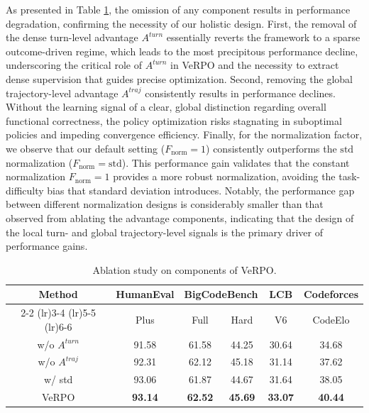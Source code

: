 \documentclass[11pt]{article}
\begin{document}
As presented in Table \ref{tab:Ablation-Study}, the omission of any component results in performance degradation, confirming the necessity of our holistic design. First, the removal of the dense turn-level advantage $A^{turn}$ essentially reverts the framework to a sparse outcome-driven regime, which leads to the most precipitous performance decline, underscoring the critical role of $A^{turn}$ in VeRPO and the necessity to extract dense supervision that guides precise optimization.
Second, removing the global trajectory-level advantage $A^{traj}$ consistently results in performance declines. Without the learning signal of a clear, global distinction regarding overall functional correctness, the policy optimization risks stagnating in suboptimal policies and impeding convergence efficiency.
Finally, for the normalization factor, we observe that our default setting ($F_{\operatorname{norm}}=1$) consistently outperforms the $\text{std}$ normalization ($F_{\operatorname{norm}}=\text{std}$). This performance gain validates that the constant normalization $F_{\operatorname{norm}}=1$ provides a more robust normalization, avoiding the task-difficulty bias that standard deviation introduces. Notably, the performance gap between different normalization designs is considerably smaller than that observed from ablating the advantage components, indicating that the design of the local turn- and global trajectory-level signals is the primary driver of performance gains.

\begin{table}[t]
\centering
\fontsize{9.5pt}{9.9pt}\selectfont
\setlength{\tabcolsep}{1.5pt}
\begin{tabular}{cccccc} 
\toprule
\multirow{2}{*}{Method} & HumanEval & \multicolumn{2}{c}{BigCodeBench} & LCB & Codeforces \\ 
\cmidrule(lr){2-2} \cmidrule(lr){3-4} \cmidrule(lr){5-5} \cmidrule(lr){6-6}
 & Plus & Full & Hard & V6 & CodeElo \\ 
\midrule
w/o $A^{turn}$ & 91.58 & 61.58 & 44.25 & 30.64 & 34.68 \\
w/o $A^{traj}$ & 92.31 & 62.12 & 45.18 & 31.14 & 37.62 \\
w/ std & 93.06 & 61.87 & 44.67 & 31.64 & 38.05 \\
\midrule
VeRPO & \textbf{93.14} & \textbf{62.52} & \textbf{45.69} & \textbf{33.07} & \textbf{40.44} \\ 
\bottomrule
\end{tabular}
\caption{Ablation study on components of VeRPO.}
\label{tab:Ablation-Study}
\end{table}
\end{document}

